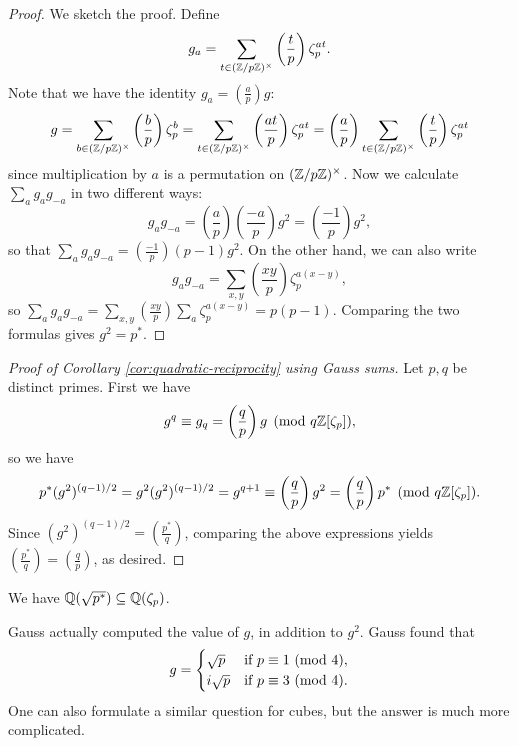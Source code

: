 \begin{proof}
  We sketch the proof. Define
  \[
    g_a = \sum_{t \in (\mathbb{Z} / p\mathbb{Z})^\times} \left(\frac{t}{p}\right)\zeta_p^{at}.
  \]
  Note that we have the identity $g_a = (\frac{a}{p}) g$:
  \[
    g = \sum_{b \in (\mathbb{Z} / p\mathbb{Z})^\times} \left(\frac{b}{p}\right) \zeta_p^b
    = \sum_{t \in (\mathbb{Z} / p\mathbb{Z})^\times} \left(\frac{at}{p}\right) \zeta_p^{at}
    = \left(\frac{a}{p}\right)\sum_{t \in (\mathbb{Z} / p\mathbb{Z})^\times} \left(\frac{t}{p}\right) \zeta_p^{at}
  \]
  since multiplication by $a$ is a permutation on
  $(\mathbb{Z} / p\mathbb{Z})^\times$. Now we calculate
  $\sum_a g_a g_{-a}$ in two different ways:
  \[
    g_a g_{-a}
    = \left(\frac{a}{p}\right)\left(\frac{-a}{p}\right) g^2
    = \left(\frac{-1}{p}\right) g^2,
  \]
  so that $\sum_a g_{a} g_{-a} = (\frac{-1}{p}) (p - 1) g^2$.
  On the other hand, we can also write
  \[
    g_a g_{-a} =
    \sum_{x, y} \left(\frac{xy}{p}\right) \zeta_p^{a(x - y)},
  \]
  so $\sum_a g_a g_{-a} = \sum_{x, y} (\frac{xy}{p}) \sum_a \zeta_p^{a(x - y)} = p(p - 1)$.
  Comparing the two formulas gives
  $g^2 = p^*$.
\end{proof}

\begin{proof}[Proof of Corollary \ref{cor:quadratic-reciprocity} using Gauss sums]
  Let $p, q$ be distinct primes. First we have
  \[
    g^q \equiv g_q = \left(\frac{q}{p}\right) g
    \pmod{q \mathbb{Z}[\zeta_p]},
  \]
  so we have
  \[
    p^* (g^2)^{(q - 1) / 2}
    = g^2 (g^2)^{(q - 1) / 2}
    = g^{q + 1} \equiv \left(\frac{q}{p}\right) g^2
    = \left(\frac{q}{p}\right) p^* \pmod{q \mathbb{Z}[\zeta_p]}.
  \]
  Since $(g^2)^{(q - 1) / 2} = (\frac{p^*}{q})$,
  comparing the above expressions
  yields $(\frac{p^*}{q}) = (\frac{q}{p})$,
  as desired.
\end{proof}

\begin{corollary}
  We have $\mathbb{Q}(\sqrt{p^*}) \subseteq \mathbb{Q}(\zeta_p)$.
\end{corollary}

\begin{remark}
  Gauss actually computed the value of $g$, in addition
  to $g^2$. Gauss found that
  \[
    g =
    \begin{cases}
      \sqrt{p} & \text{if $p \equiv 1 \ (\mathrm{mod}\ 4)$}, \\
      i \sqrt{p} & \text{if $p \equiv 3 \ (\mathrm{mod}\ 4)$}.
    \end{cases}
  \]
  One can also formulate a similar question for
  cubes, but the answer is much more complicated.
\end{remark}
